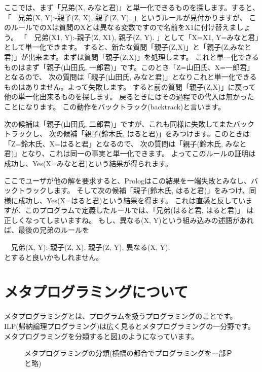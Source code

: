 \documentclass[a4j,dvipdfmx]{jsarticle}
\newcommand{\fixed}[1]{{\ttfamily #1}}
\begin{document}
ここでは、まず「兄弟(X, みなと君)」と単一化できるものを探します。すると、
「{\fixed 　兄弟(X, Y):-親子(Z, X), 親子(Z, Y). }」というルールが見付かりますが、
このルールでのXは質問のXとは異なる変数ですので名前をX1に付け替えましょう。
「{\fixed 　兄弟(X1, Y):-親子(Z, X1), 親子(Z, Y). }」として「X=X1, Y=みなと君」として単一化できます。
すると、新たな質問「親子(Z,X)」と「親子(Z,みなと君)」が出来ます。まずは質問「親子(Z,X)」を処理します。
これと単一化できるものはまず「親子(山田氏, 一郎君)」です。このとき「Z=山田氏、X=一郎君」となるので、
次の質問は「親子(山田氏, みなと君)」となりこれと単一化できるものはありません。よって失敗します。
すると前の質問「親子(Z,X)」に戻って他の単一化出来るものを探します。
戻るときにはその過程での代入は無かったことになります。
この動作をバックトラック(backtrack)と言います。

次の候補は「親子(山田氏, 二郎君)」ですが、これも同様に失敗してまたバックトラックし、
次の候補「親子(鈴木氏, はると君)」をみつけます。このときは「Z=鈴木氏、X=はると君」となるので、
次の質問は「親子(鈴木氏, みなと君)」となり、これは同一の事実と単一化できます。
よってこのルールの証明は成功し、Yes(X=みなと君)という結果が得られます。

ここでユーザが他の解を要求すると、Prologはこの結果を一端失敗とみなし、バックトラックします。
そして次の候補「親子(鈴木氏, はると君)」をみつけ、同様に成功し、Yes(X=はると君)という結果を得ます。
これは直感と反していますが、このプログラムで定義したルールでは、「兄弟(はると君, はると君)」
は正しくなってしまいますね。
もし、異なる(X, Y)という組み込みの述語があれば、最後の兄弟のルールを

{\fixed 　兄弟(X, Y):-親子(Z, X), 親子(Z, Y), 異なる(X, Y). } \\

とすると良いかもしれません。

\section{メタプログラミングについて}
メタプログラミングとは、プログラムを扱うプログラミングのことです。
ILP(帰納論理プログラミング)は広く見るとメタプログラミングの一分野です。
メタプログラミングを分類すると図\ref{fig:metaprogramming}のようになっています。

\begin{figure}[htbp]
\centering
{}
\caption{メタプログラミングの分類(横幅の都合でプログラミングを一部Ｐと略)}
\label{fig:metaprogramming}
\end{figure}
\end{document}
